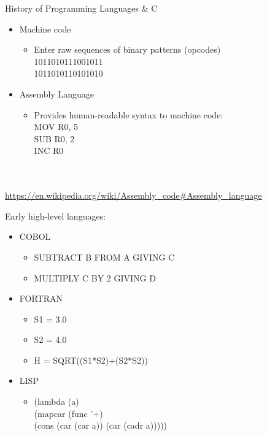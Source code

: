 \documentclass[graphics]{beamer}
\begin{document}
\begin{frame}{History of Programming Languages \& C}
     {
        \begin{itemize}
            \item Machine code
            \begin{itemize}
                \item Enter raw sequences of binary patterns (opcodes) \\
                1011010111001011 \\
                1011010110101010
            \end{itemize}
            \item Assembly Language
            \begin{itemize}
                \item Provides human-readable syntax to machine code: \\
                MOV R0, 5 \\
                SUB R0, 2 \\
                INC R0
            \end{itemize}
        \end{itemize}
        \\ ~~ \\
        \footnotesize{\url{https://en.wikipedia.org/wiki/Assembly_code\#Assembly_language}}
    }
     {
        Early high-level languages:
        \begin{itemize}
            \item COBOL
            \begin{itemize}
                \item SUBTRACT B FROM A GIVING C
                \item MULTIPLY C BY 2 GIVING D
            \end{itemize}
            \item FORTRAN
            \begin{itemize}
                \item S1 = 3.0
                \item S2 = 4.0
                \item H = SQRT((S1*S2)+(S2*S2))
            \end{itemize}
            \item LISP
            \begin{itemize}
                \item (lambda (a) \\
	            (mapcar (func '+) \\
	            (cons (car (car a)) (car (cadr a)))))
            \end{itemize}
        \end{itemize}
    }
\end{frame}
\end{document}
